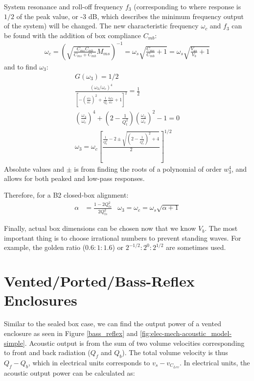 \documentclass[10pt]{book}
\begin{document}
System resonance and roll-off frequency $f_3$ (corresponding to where response is $1/2$ of the peak value, or -3 dB, which describes the minimum frequency output of the system) will be changed. The new characteristic frequency $\omega_c$ and $f_3$ can be found with the addition of box compliance $C_{mb}$:
\begin{align}
\omega_c=\left( \sqrt{\frac{C_{ms}C_{mb}}{C_{ms}+C_{mb}}M_{ms}}  \right)^{-1}=\omega_s\sqrt{\frac{C_{ms}}{C_{mb}}+1}=\omega_s\sqrt{\frac{V_{as}}{V_{b}}+1}
\end{align}
and to find $\omega_3$:
\begin{align}
G(\omega_3)=1/2\\
\frac{(\omega_3/\omega_c )^4}{
\left[ -\left( \frac{\omega_3}{\omega_c} \right)^2 +\frac{1}{Q_t}\frac{i\omega_3}{\omega_c}+1\right]^{2}} = \frac{1}{2}\\
\left( \frac{\omega_3}{\omega_c} \right)^4 +\left( 2 -\frac{1}{Q_t^2}\right)\left(\frac{\omega_3}{\omega_c} \right)^2-1=0\\
\omega_3=\omega_c \left[ \frac{  \frac{1}{Q_{t}^2}-2  \pm \sqrt{\left( 2- \frac{1}{Q_{t}^2}\right)^2+4}}{2}\right]^{1/2}
\end{align}
Absolute values and $\pm$ is from finding the roots of a polynomial of order $w_3^4$, and allows for both peaked and low-pass responses.



Therefore, for a B2 closed-box alignment:
\begin{align}
\alpha&=\frac{1-2 Q_{ts}^2}{2 Q_{ts}^2} & \omega_3=\omega_c=\omega_s\sqrt{\alpha+1}
\end{align}

Finally, actual box dimensions can be chosen now that we know $V_b$. The most important thing is to choose irrational numbers to prevent standing waves. For example, the golden ratio ($0.6:1:1.6$) or ${2}^{-1/2}:{2}^{0}:{2}^{1/2}$ are sometimes used.

\section{Vented/Ported/Bass-Reflex Enclosures} Similar to the sealed box case, we can find the output power of a vented enclosure as seen in Figure \ref{bass_reflex} and \ref{fig:elec-mech-acoustic_model-simple}. Acoustic output is from the sum of two volume velocities corresponding to front and back radiation ($Q_f$ and $Q_b$). The total volume velocity is thus $Q_f-Q_b$, which in electrical units corresponds to  $v_s-v_{C_{Lev}}$. In electrical units, the acoustic output power can be calculated as:
\end{document}
